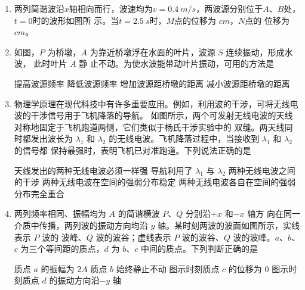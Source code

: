 \begin{enumerate}
\item 
{}
两列简谐波沿$ x $轴相向而行，波速均为$ v=0.4 \ m /s $，两波源分别位于$ A $、$ B $处，$ t=0 $时的波形如图所
示。当$ t=2.5 \ s $时，$ M $点的位移为 \underlinegap $ cm $，$ N $点的
位移为 \underlinegap $ cm $。
\begin{figure}[h!]
	\centering
	
\end{figure}





\item 
{}
如图，$ P $ 为桥墩，$ A $ 为靠近桥墩浮在水面的叶片，波源 $ S $ 连续振动，形成水波，
此时叶片 $ A $ 静
止不动。为使水波能带动叶片振动，可用的方法是  
\begin{figure}[h!]
	\centering
	
\end{figure}

\fourchoices
{提高波源频率}
{降低波源频率}
{增加波源距桥墩的距离}
{减小波源距桥墩的距离}

\item 
{}
 物理学原理在现代科技中有许多重要应用。例如，利用波的干涉，可将无线电
波的干涉信号用于飞机降落的导航。
如图所示，两个可发射无线电波的天线对称地固定于飞机跑道两侧，它们类似于杨氏干涉实验中的
双缝。两天线同时都发出波长为 $ \lambda_{1} $ 和 $ \lambda_{2} $ 的无线电波。飞机降落过程中，当接收到 $ \lambda_{1} $ 和 $ \lambda_{2} $ 的信号都
保持最强时，表明飞机已对准跑道。下列说法正确的是  
\begin{figure}[h!]
	\centering
	
\end{figure}

\fourchoices
{天线发出的两种无线电波必须一样强}
{导航利用了 $ \lambda_{1} $ 与 $ \lambda_{2} $ 两种无线电波之间的干涉}
{两种无线电波在空间的强弱分布稳定}
{两种无线电波各自在空间的强弱分布完全重合}


\item 
{}
两列频率相同、振幅均为 $ A $ 的简谐横波 $ P $、$ Q $ 分别沿$ +x $ 和$ -x $ 轴方
向在同一介质中传播，两列波的振动方向均沿 $ y $ 轴。某时刻两波的波面如图所示，实线表示 $ P $ 波的
波峰、$ Q $ 波的波谷；虚线表示 $ P $ 波的波谷、$ Q $ 波的波峰。$ a $、$ b $、$ c $
为三个等间距的质点，$ d $ 为 $ b $、$ c $ 中间的质点。下列判断正确的是  
\begin{figure}[h!]
	\centering
	
\end{figure}


\fourchoices
{质点 $ a $ 的振幅为 $ 2 A $}
{质点 $ b $ 始终静止不动}
{图示时刻质点 $ c $ 的位移为 $ 0 $}
{图示时刻质点 $ d $ 的振动方向沿$ -y $ 轴}





	
	
	
\end{enumerate}

